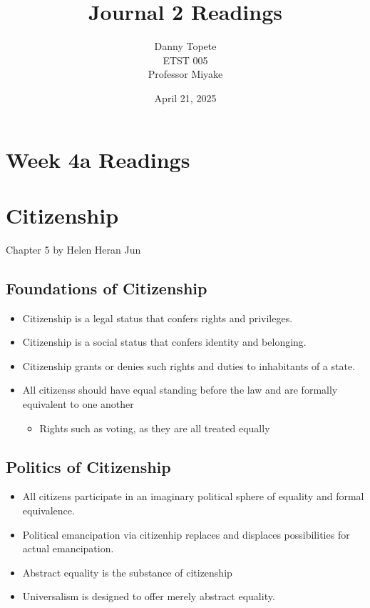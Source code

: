 \documentclass{article}
\title{Journal 2 Readings}
\author{Danny Topete\\ ETST 005\\ Professor Miyake}
\date{April 21, 2025}
\begin{document}
\maketitle

\section*{Week 4a Readings}

\section{Citizenship}
Chapter 5
by Helen Heran Jun
\subsection{Foundations of Citizenship}
\begin{itemize}
  \item Citizenship is a legal status that confers rights and privileges.
  \item Citizenship is a social status that confers identity and belonging.
  \item Citizenship grants or denies such rights and duties to
    inhabitants of a state.
  \item All citizenss should have equal standing before 
    the law and are formally equivalent to one another
    \begin{itemize}
      \item Rights such as voting, as they are all treated equally
    \end{itemize}
\end{itemize}

\subsection{Politics of Citizenship}
\begin{itemize}
  \item All citizens participate in an imaginary
    political sphere of equality and formal equivalence.
  \item Political emancipation via citizenhip replaces and displaces
    possibilities for actual emancipation.
  \item Abstract equality is the substance of citizenship
  \item Universalism is designed to offer merely abstract equality.
\end{itemize}
\end{document}
